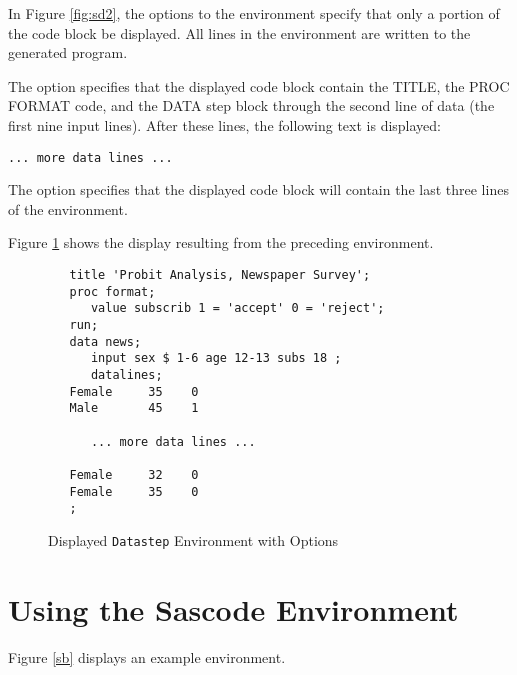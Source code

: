 \documentclass[article,oneside]{memoir}
\begin{document}
  In Figure \ref{fig:sd2}, the options to the  environment specify that only a portion
  of the code block be displayed.  All lines in the environment are written to the 
  generated program.
  
  The option  specifies that the displayed code
  block contain the TITLE, the PROC FORMAT code, and the DATA step block through the
  second line of data (the first nine input lines). After these lines, the 
  following text is displayed:\par\texttt{... more data lines ...}
  
  The option  specifies that the displayed code block
  will contain the last three lines of the environment.
  
  Figure \ref{fig:sd3} shows the display resulting from the preceding 
 environment.
\begin{figure}[H]
\begin{snugshade}
\begin{verbatim}
   title 'Probit Analysis, Newspaper Survey';
   proc format;
      value subscrib 1 = 'accept' 0 = 'reject';
   run;
   data news;
      input sex $ 1-6 age 12-13 subs 18 ;
      datalines;
   Female     35    0 
   Male       45    1 
   
      ... more data lines ...
      
   Female     32    0 
   Female     35    0 
   ;
\end{verbatim}
\end{snugshade}
\caption{Displayed \texttt{Datastep} Environment with Options}\label{fig:sd3}
\end{figure}
  

\section{Using the Sascode Environment}\label{scex}
Figure \ref{sb} displays an example  environment.
  
\end{document}
